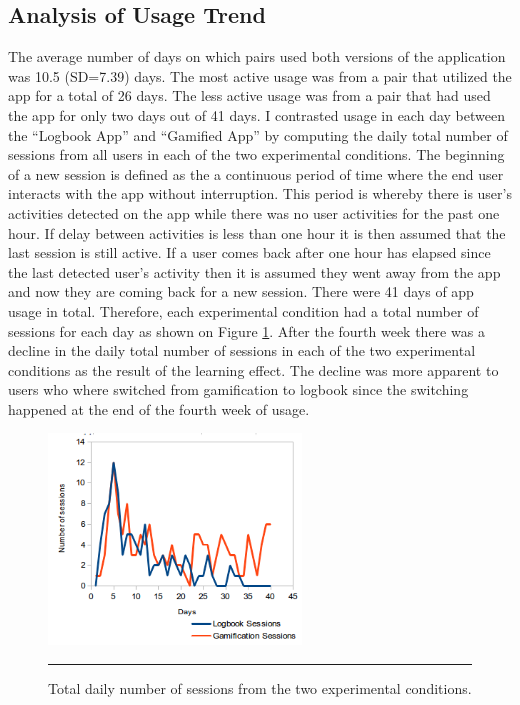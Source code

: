 \subsection{Analysis of Usage Trend}
The average number of days on which pairs used both versions of the application was 10.5 (SD=7.39) days. The most active usage was from a pair that utilized the app for a total of 26 days. The less active usage was from a pair that had used the app for only two days out of 41 days.\newline
I contrasted usage in each day between the ``Logbook App'' and ``Gamified App'' by computing the daily total number of sessions from all users in each of the two experimental conditions. The beginning of a new session is defined as the a continuous period of time where the end user interacts with the app without interruption. This period is whereby there is user's activities detected on the app while there was no user activities for the past one hour. If delay between activities is less than one hour it is then assumed that the last session is still active. If a user comes back after one hour has elapsed since the last detected user's activity then it is assumed they went away from the app and now they are coming back for a new session. There were 41 days of app usage in total. Therefore, each experimental condition had a total number of sessions for each day as shown on Figure \ref{figure:usagedailysessions}. After the fourth week there was a decline in the daily total number of sessions in each of the two experimental conditions as the result of the learning effect. The decline was more apparent to users who where switched from gamification to logbook since the switching happened at the end of the fourth week of usage.\newline
\begin{figure}[htbp]
  \centering
    \includegraphics[width=0.6\textwidth]{Figures/scatter_daily_sessions.png}
    \rule{35em}{0.5pt}
  \caption{Total daily number of sessions from the two experimental conditions.}
  \label{figure:usagedailysessions}
\end{figure}\newline
